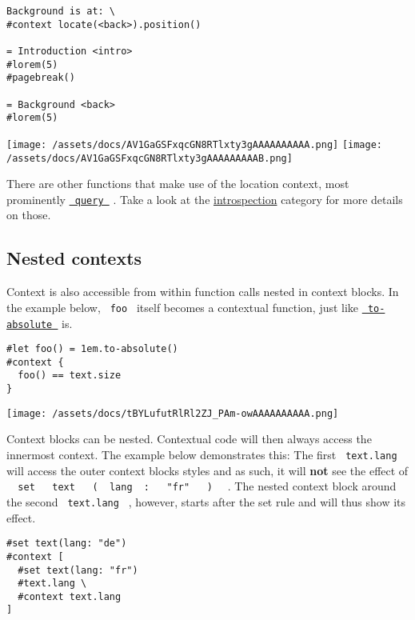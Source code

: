 \begin{verbatim}
Background is at: \
#context locate(<back>).position()

= Introduction <intro>
#lorem(5)
#pagebreak()

= Background <back>
#lorem(5)
\end{verbatim}

\texttt{[image: /assets/docs/AV1GaGSFxqcGN8RTlxty3gAAAAAAAAAA.png]}
\texttt{[image: /assets/docs/AV1GaGSFxqcGN8RTlxty3gAAAAAAAAAB.png]}

There are other functions that make use of the location context, most
prominently
\href{/docs/reference/introspection/query/}{\texttt{\ query\ }} . Take a
look at the \href{/docs/reference/introspection/}{introspection}
category for more details on those.

\subsection{Nested contexts}\label{nested-contexts}

Context is also accessible from within function calls nested in context
blocks. In the example below, \texttt{\ foo\ } itself becomes a
contextual function, just like
\href{/docs/reference/layout/length/\#definitions-to-absolute}{\texttt{\ to-absolute\ }}
is.

\begin{verbatim}
#let foo() = 1em.to-absolute()
#context {
  foo() == text.size
}
\end{verbatim}

\texttt{[image: /assets/docs/tBYLufutRlRl2ZJ\_PAm-owAAAAAAAAAA.png]}

Context blocks can be nested. Contextual code will then always access
the innermost context. The example below demonstrates this: The first
\texttt{\ text.lang\ } will access the outer context
block\textquotesingle s styles and as such, it will \textbf{not} see the
effect of
\texttt{\ }{\texttt{\ set\ }}\texttt{\ }{\texttt{\ text\ }}\texttt{\ }{\texttt{\ (\ }}\texttt{\ lang\ }{\texttt{\ :\ }}\texttt{\ }{\texttt{\ "fr"\ }}\texttt{\ }{\texttt{\ )\ }}\texttt{\ }
. The nested context block around the second \texttt{\ text.lang\ } ,
however, starts after the set rule and will thus show its effect.

\begin{verbatim}
#set text(lang: "de")
#context [
  #set text(lang: "fr")
  #text.lang \
  #context text.lang
]
\end{verbatim}

